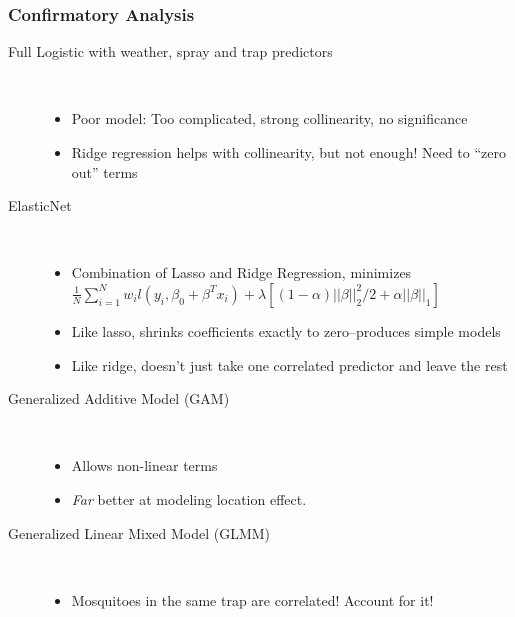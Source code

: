 \documentclass[handout]{beamer}
\begin{document}
\begin{frame}
\frametitle{Confirmatory Analysis}
\begin{scriptsize}
\begin{description}
\item[Full Logistic with weather, spray and trap predictors]\
\begin{itemize}
\item Poor model: Too complicated, strong collinearity, no significance
\item Ridge regression helps with collinearity, but not enough! Need to ``zero out'' terms
\end{itemize}
\item[ElasticNet]\
\begin{itemize}
\item Combination of Lasso and Ridge Regression, minimizes
$ \scriptstyle \frac{1}{N} \sum_{i=1}^{N} w_i l(y_i,\beta_0+\beta^T x_i) + \lambda\left[(1-\alpha)||\beta||_2^2/2 + \alpha ||\beta||_1\right] $
\item Like lasso, shrinks coefficients exactly to zero--produces simple models
\item Like ridge, doesn't just take one correlated predictor and leave the rest
\end{itemize}
\item[Generalized Additive Model (GAM)]\
\begin{itemize}
\item Allows non-linear terms
\item \emph{Far} better at modeling location effect.
\end{itemize}
\item[Generalized Linear Mixed Model (GLMM)]\
\begin{itemize}
\item Mosquitoes in the same trap are correlated! Account for it!
\end{itemize}
\end{description}
\end{scriptsize}
\end{frame}
\end{document}
